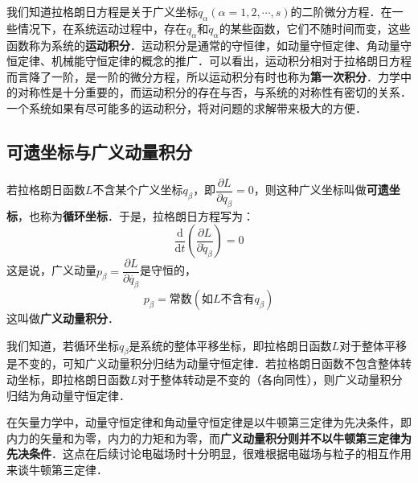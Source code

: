 

我们知道拉格朗日方程是关于广义坐标$q_\alpha(\alpha=1,2,\cdots,s)$的二阶微分方程．在一些情况下，在系统运动过程中，存在$q_\alpha$和$\dot{q}_\alpha$的某些函数，它们不随时间而变，这些函数称为系统的\textbf{运动积分}．运动积分是通常的守恒律，如动量守恒定律、角动量守恒定律、机械能守恒定律的概念的推广．可以看出，运动积分相对于拉格朗日方程而言降了一阶，是一阶的微分方程，所以运动积分有时也称为\textbf{第一次积分}．力学中的对称性是十分重要的，而运动积分的存在与否，与系统的对称性有密切的关系．一个系统如果有尽可能多的运动积分，将对问题的求解带来极大的方便．

\subsection{可遗坐标与广义动量积分}

若拉格朗日函数$L$不含某个广义坐标$q_\beta$，即$\dfrac{\partial L}{\partial q_\beta}=0$，则这种广义坐标叫做\textbf{可遗坐标}，也称为\textbf{循环坐标}．于是，拉格朗日方程写为：
\begin{equation}
\frac{\mathrm{d}}{\mathrm{d} t}\left(\frac{\partial L}{\partial \dot{q}_{\beta}}\right)=0
\end{equation}
这是说，广义动量$p_\beta=\dfrac{\partial L} {\partial \dot{q_\beta}}$是守恒的，
\begin{equation}
p_\beta=常数(如L不含有q_\beta)
\end{equation}
这叫做\textbf{广义动量积分}．

我们知道，若循环坐标$q_\beta$是系统的整体平移坐标，即拉格朗日函数$L $对于整体平移是不变的，可知广义动量积分归结为动量守恒定律．若拉格朗日函数不包含整体转动坐标，即拉格朗日函数$L$对于整体转动是不变的（各向同性），则广义动量积分归结为角动量守恒定律．

在矢量力学中，动量守恒定律和角动量守恒定律是以牛顿第三定律为先决条件，即内力的矢量和为零，内力的力矩和为零，而\textbf{广义动量积分则并不以牛顿第三定律为先决条件}．这点在后续讨论电磁场时十分明显，很难根据电磁场与粒子的相互作用来谈牛顿第三定律．

